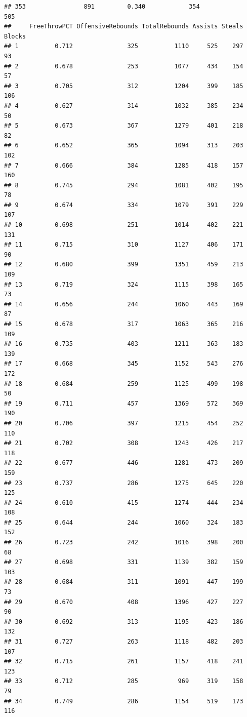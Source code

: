 \documentclass[]{book}
\begin{document}
\begin{verbatim}
## 353                891         0.340            354                 505
##     FreeThrowPCT OffensiveRebounds TotalRebounds Assists Steals Blocks
## 1          0.712               325          1110     525    297     93
## 2          0.678               253          1077     434    154     57
## 3          0.705               312          1204     399    185    106
## 4          0.627               314          1032     385    234     50
## 5          0.673               367          1279     401    218     82
## 6          0.652               365          1094     313    203    102
## 7          0.666               384          1285     418    157    160
## 8          0.745               294          1081     402    195     78
## 9          0.674               334          1079     391    229    107
## 10         0.698               251          1014     402    221    131
## 11         0.715               310          1127     406    171     90
## 12         0.680               399          1351     459    213    109
## 13         0.719               324          1115     398    165     73
## 14         0.656               244          1060     443    169     87
## 15         0.678               317          1063     365    216    109
## 16         0.735               403          1211     363    183    139
## 17         0.668               345          1152     543    276    172
## 18         0.684               259          1125     499    198     50
## 19         0.711               457          1369     572    369    190
## 20         0.706               397          1215     454    252    110
## 21         0.702               308          1243     426    217    118
## 22         0.677               446          1281     473    209    159
## 23         0.737               286          1275     645    220    125
## 24         0.610               415          1274     444    234    108
## 25         0.644               244          1060     324    183    152
## 26         0.723               242          1016     398    200     68
## 27         0.698               331          1139     382    159    103
## 28         0.684               311          1091     447    199     73
## 29         0.670               408          1396     427    227     90
## 30         0.692               313          1195     423    186    132
## 31         0.727               263          1118     482    203    107
## 32         0.715               261          1157     418    241    123
## 33         0.712               285           969     319    158     79
## 34         0.749               286          1154     519    173    116

\end{verbatim}
\end{document}
